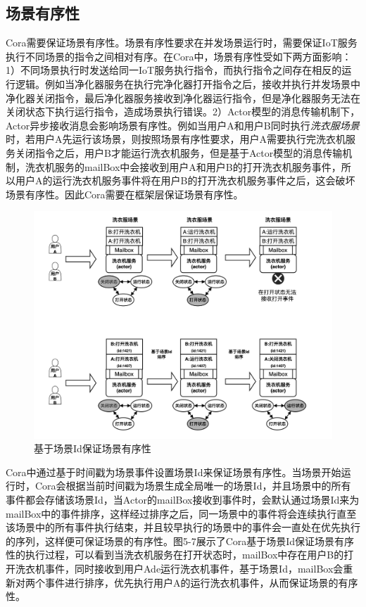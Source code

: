 \documentclass[winfonts,master,twoside]{njuthesis}
\begin{document}
\subsection{场景有序性}
Cora需要保证场景有序性。场景有序性要求在并发场景运行时，需要保证IoT服务执行不同场景的指令之间相对有序。在Cora中，场景有序性受如下两方面影响：1）不同场景执行时发送给同一IoT服务执行指令，而执行指令之间存在相反的运行逻辑。例如当净化器服务在执行完净化器打开指令之后，接收并执行并发场景中净化器关闭指令，最后净化器服务接收到净化器运行指令，但是净化器服务无法在关闭状态下执行运行指令，造成场景执行错误。2）Actor模型的消息传输机制下，Actor异步接收消息会影响场景有序性。例如当用户A和用户B同时执行\textit{洗衣服场景}时，若用户A先运行该场景，则按照场景有序性要求，用户A需要执行完洗衣机服务关闭指令之后，用户B才能运行洗衣机服务，但是基于Actor模型的消息传输机制，洗衣机服务的mailBox中会接收到用户A和用户B的打开洗衣机服务事件，所以用户A的运行洗衣机服务事件将在用户B的打开洗衣机服务事件之后，这会破坏场景有序性。因此Cora需要在框架层保证场景有序性。
\begin{figure}
	\centering
	\includegraphics[width=1.0\textwidth]{figure/4-cora/atomicty.png}
	\caption{基于场景Id保证场景有序性}
	\label{ontransact-impl}
\end{figure}

Cora中通过基于时间戳为场景事件设置场景Id来保证场景有序性。当场景开始运行时，Cora会根据当前时间戳为场景生成全局唯一的场景Id，并且场景中的所有事件都会存储该场景Id，当Actor的mailBox接收到事件时，会默认通过场景Id来为mailBox中的事件排序，这样经过排序之后，同一场景中的事件将会连续执行直至该场景中的所有事件执行结束，并且较早执行的场景中的事件会一直处在优先执行的序列，这样便可保证场景的有序性。图5-7展示了Cora基于场景Id保证场景有序性的执行过程，可以看到当洗衣机服务在打开状态时，mailBox中存在用户B的打开洗衣机事件，同时接收到用户Ade运行洗衣机事件，基于场景Id，mailBox会重新对两个事件进行排序，优先执行用户A的运行洗衣机事件，从而保证场景的有序性。
\end{document}
